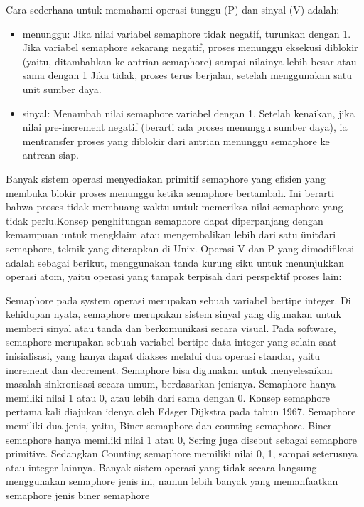 		Cara sederhana untuk memahami operasi tunggu (P) dan sinyal (V) adalah:
		
		\begin{itemize}
		
			\item menunggu: Jika nilai variabel semaphore tidak negatif, turunkan dengan 1. Jika variabel semaphore sekarang negatif, proses menunggu eksekusi diblokir (yaitu, ditambahkan ke antrian semaphore) sampai nilainya lebih besar atau sama dengan 1 Jika tidak, proses terus berjalan, setelah menggunakan satu unit sumber daya.
			\item sinyal: Menambah nilai semaphore variabel dengan 1. Setelah kenaikan, jika nilai pre-increment negatif (berarti ada proses menunggu sumber daya), ia mentransfer proses yang diblokir dari antrian menunggu semaphore ke antrean siap.
			
		\end{itemize}
		
		Banyak sistem operasi menyediakan primitif semaphore yang efisien yang membuka blokir proses menunggu ketika semaphore bertambah. Ini berarti bahwa proses tidak membuang waktu untuk memeriksa nilai semaphore yang tidak perlu.Konsep penghitungan semaphore dapat diperpanjang dengan kemampuan untuk mengklaim atau mengembalikan lebih dari satu \"unit\" dari semaphore, teknik yang diterapkan di Unix. Operasi V dan P yang dimodifikasi adalah sebagai berikut, menggunakan tanda kurung siku untuk menunjukkan operasi atom, yaitu operasi yang tampak terpisah dari perspektif proses lain:

		Semaphore pada system operasi merupakan sebuah variabel bertipe integer. Di kehidupan nyata, semaphore merupakan sistem sinyal 		yang digunakan untuk memberi sinyal atau tanda dan berkomunikasi secara visual. Pada software, semaphore merupakan sebuah variabel bertipe data integer yang selain saat inisialisasi, yang hanya dapat diakses melalui dua operasi standar, yaitu increment dan decrement.
		Semaphore bisa digunakan untuk menyelesaikan masalah sinkronisasi secara umum, berdasarkan jenisnya. Semaphore hanya memiliki nilai 1 atau 0, atau lebih dari sama dengan 0. Konsep semaphore pertama kali diajukan idenya oleh Edsger Dijkstra pada tahun 1967. Semaphore memiliki dua jenis, yaitu, Biner semaphore dan counting semaphore. Biner semaphore hanya memiliki nilai 1 atau 0, Sering juga disebut sebagai semaphore primitive. Sedangkan Counting semaphore memiliki nilai 0, 1, sampai seterusnya atau integer lainnya. Banyak sistem operasi yang tidak secara langsung menggunakan semaphore jenis ini, namun lebih banyak yang memanfaatkan semaphore jenis biner semaphore

